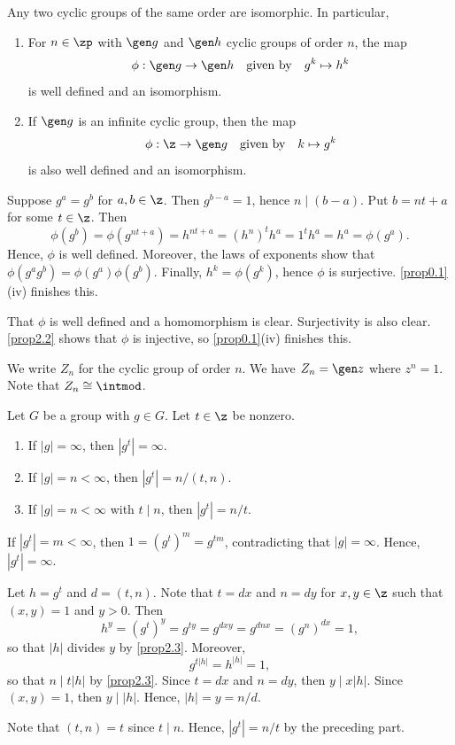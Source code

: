  \label{theo2.4}
Any two cyclic groups of the same order are isomorphic. In particular,
\begin{enumerate}
    \item For $n \in \zp$ with $\gen g$ and $\gen h$ cyclic groups of order $n$, the map
    \[\phi : \gen g \to \gen h \quad \text{given by} \quad g^k \mapsto h^k\]
    is well defined and an isomorphism.
    \item If $\gen g$ is an infinite cyclic group, then the map
    \[\phi : \z \to \gen g \quad \text{given by} \quad k \mapsto g^k\]
    is also well defined and an isomorphism.
\end{enumerate}

\begin{proofnum}
    \item Suppose $g^a = g^b$ for $a, b \in \z$. Then $g^{b - a} = 1$, hence $n \mid (b - a)$. Put $b = nt + a$ for some $t \in \z$. Then
    \[\phi(g^b) = \phi(g^{nt + a}) = h^{nt + a} = (h^n)^t h^a = 1^t h^a = h^a = \phi(g^a).\]
    Hence, $\phi$ is well defined. Moreover, the laws of exponents show that $\phi(g^ag^b) = \phi(g^a)\phi(g^b)$. Finally, $h^k = \phi(g^k)$, hence $\phi$ is surjective. \autoref{prop0.1}(iv) finishes this.
    \item That $\phi$ is well defined and a homomorphism is clear. Surjectivity is also clear. \autoref{prop2.2} shows that $\phi$ is injective, so \autoref{prop0.1}(iv) finishes this.
\end{proofnum}

\note We write $Z_n$ for the cyclic group of order $n$. We have $Z_n = \gen z$ where $z^n = 1$. Note that $Z_n \cong \intmod$.

\newpage

 \label{prop2.5}
Let $G$ be a group with $g \in G$. Let $t \in \z$ be nonzero.
\begin{enumerate}
    \item If $|g| = \infty$, then $|g^t| = \infty$.
    \item If $|g| = n < \infty$, then $|g^t| = n/(t, n)$.
    \item If $|g| = n < \infty$ with $t \mid n$, then $|g^t| = n/t$.
\end{enumerate}

\begin{proofnum}
    \item If $|g^t| = m < \infty$, then $1 = (g^t)^m = g^{tm}$, contradicting that $|g| = \infty$. Hence, $|g^t| = \infty$.
    \item Let $h = g^t$ and $d = (t, n)$. Note that $t = dx$ and $n = dy$ for $x, y \in \z$ such that $(x, y) = 1$ and $y > 0$. Then
    \[h^y = (g^t)^y = g^{ty} = g^{dxy} = g^{dnx} = (g^n)^{dx} = 1,\]
    so that $|h|$ divides $y$ by \autoref{prop2.3}. Moreover,
    \[g^{t|h|} = h^{|h|} = 1,\]
    so that $n \mid t|h|$ by \autoref{prop2.3}. Since $t = dx$ and $n = dy$, then $y \mid x|h|$. Since $(x, y) = 1$, then $y \mid |h|$. Hence, $|h| = y = n/d$.
    \item Note that $(t, n) = t$ since $t \mid n$. Hence, $|g^t| = n/t$ by the preceding part.
\end{proofnum}

